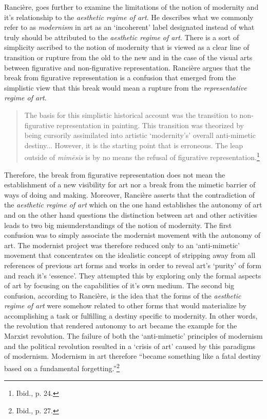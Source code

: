 Ranci\`{e}re, goes further to examine the limitations of the notion of modernity and it's relationship to the \emph{aesthetic regime of art}. He describes what we commonly refer to as \emph{modernism} in art as an `incoherent' label designated instead of what truly should be attributed to the \emph{aesthetic regime of art}. There is a sort of simplicity ascribed to the notion of modernity that is viewed as a clear line of transition or rupture from the old to the new and in the case of the visual arts between figurative and non-figurative representation. Ranci\`{e}re argues that the break from figurative representation is a confusion that emerged from the simplistic view that this break would mean a rupture from the \emph{representative regime of art}.

\begin{quote}
The basis for this simplistic historical account was the transition to non-figurative representation in painting. This transition was theorized by being cursorily assimilated into artistic `modernity's' overall anti-mimetic destiny... However, it is the starting point that is erroneous. The leap outside of \emph{mim\={e}sis} is by no means the refusal of figurative representation.\footnote{Ibid., p. 24.}
\end{quote}

Therefore, the break from figurative representation does not mean the establishment of a new visibility for art nor a break from the mimetic barrier of ways of doing and making. Moreover, Ranci\`{e}re asserts that the contradiction of the \emph{aesthetic regime of art} which on the one hand establishes the autonomy of art and on the other hand questions the distinction between art and other activities leads to two big misunderstandings of the notion of modernity. The first confusion was to simply associate the modernist movement with the autonomy of art. The modernist project was therefore reduced only to an `anti-mimetic' movement that concentrates on the idealistic concept of stripping away from all references of previous art forms and works in order to reveal art's `purity' of form and reach it's `essence'. They attempted this by exploring only the formal aspects of art by focusing on the capabilities of it's own medium. The second big confusion, according to Ranci\`{e}re, is the idea that the forms of the \emph{aesthetic regime of art} were somehow related to other forms that would materialize by accomplishing a task or fulfilling a destiny specific to modernity. In other words, the revolution that rendered autonomy to art became the example for the Marxist revolution. The failure of both the `anti-mimetic' principles of modernism and the political revolution resulted in a `crisis of art' caused by this paradigms of modernism. Modernism in art therefore ``became something like a fatal destiny based on a fundamental forgetting.''\footnote{Ibid., p. 27.} 


